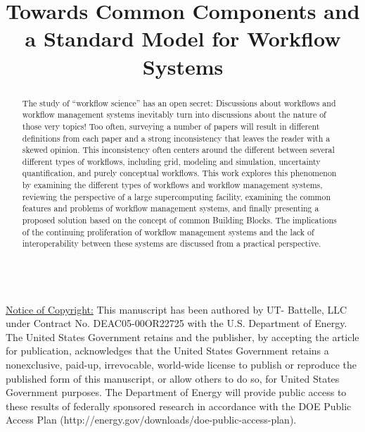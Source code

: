 \documentclass[10pt,conference,final]{IEEEtran}
\begin{document}
\title{Towards Common Components and a Standard Model for Workflow Systems}


\author{  \and {}  }

\maketitle

\begin{abstract}

The study of ``workflow science'' has an open secret: Discussions about workflows and workflow management systems inevitably turn into discussions about the nature of those very topics! Too often, surveying a number of papers will result in different definitions from each paper and a strong inconsistency that leaves the reader with a skewed opinion. This inconsistency often centers around the different between several different types of workflows, including grid, modeling and simulation, uncertainty quantification, and purely conceptual workflows. This work explores this phenomenon by examining the different types of workflows and workflow management systems, reviewing the perspective of a large supercomputing facility, examining the common features and problems of workflow management systems, and finally presenting a proposed solution based on the concept of common Building Blocks. The implications of the continuing proliferation of workflow management systems and the lack of interoperability between these systems are discussed from a practical perspective.

\end{abstract}
\hfill \\
\underline{Notice of Copyright:} This manuscript has been authored by UT-
Battelle, LLC under Contract No. DEAC05-00OR22725 with the U.S. Department of
Energy. The United States Government retains and the publisher, by accepting
the article for publication, acknowledges that the United States Government
retains a nonexclusive, paid-up, irrevocable, world-wide license to publish or
reproduce the published form of this manuscript, or allow others to do so, for
United States Government purposes. The Department of Energy will provide
public access to these results of federally sponsored research in accordance
with the DOE Public Access Plan (http://energy.gov/downloads/doe-public-access-plan).












\end{document}
